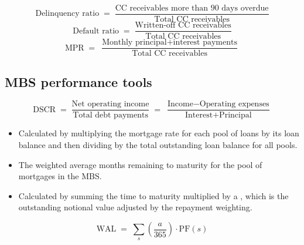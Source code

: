 \begin{crfmlbox}
\[ \text{Delinquency ratio} \;=\;
   \frac{\text{CC receivables more than 90 days overdue}}{\text{Total CC receivables}} \]
\[ \text{Default ratio} \;=\;
   \frac{\text{Written-off CC receivables}}{\text{Total CC receivables}} \]
\[ \mathrm{MPR} \;=\;
   \frac{\text{Monthly principal} + \text{interest payments}}{\text{Total CC receivables}} \]
\end{crfmlbox}

\subsection*{MBS performance tools}

\begin{crfmlbox}
\[ \mathrm{DSCR} \;=\; \frac{\text{Net operating income}}{\text{Total debt payments}}
   \;=\; \frac{\text{Income} - \text{Operating expenses}}{\text{Interest} + \text{Principal}} \]
\end{crfmlbox}

\begin{itemize}
\item {} Calculated by multiplying the mortgage
rate for each pool of loans by its loan balance and then dividing by the total
outstanding loan balance for all pools.
\item {} The weighted average months
remaining to maturity for the pool of mortgages in the MBS.
\item {} Calculated by summing the time to
maturity multiplied by a , which is the outstanding notional
value adjusted by the repayment weighting.
\end{itemize}

\begin{crfmlbox}
\[ \mathrm{WAL} \;=\; \sum_{s} \left(\frac{a}{365}\right)\cdot \mathrm{PF}(s) \]
\end{crfmlbox}

